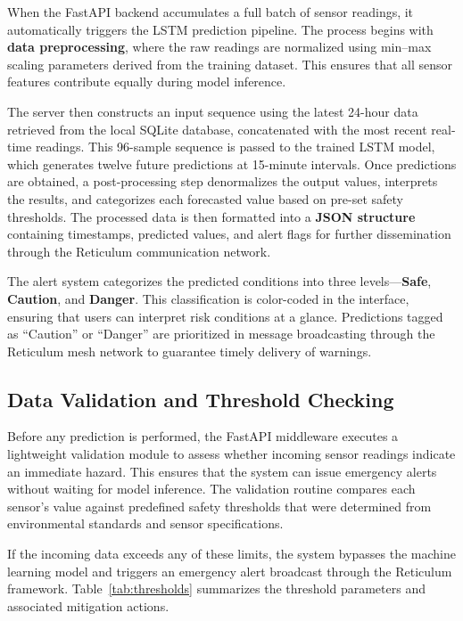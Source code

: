 When the FastAPI backend accumulates a full batch of sensor readings, it automatically triggers the LSTM prediction pipeline. The process begins with \textbf{data preprocessing}, where the raw readings are normalized using min–max scaling parameters derived from the training dataset. This ensures that all sensor features contribute equally during model inference.

The server then constructs an input sequence using the latest 24-hour data retrieved from the local SQLite database, concatenated with the most recent real-time readings. This 96-sample sequence is passed to the trained LSTM model, which generates twelve future predictions at 15-minute intervals. Once predictions are obtained, a post-processing step denormalizes the output values, interprets the results, and categorizes each forecasted value based on pre-set safety thresholds. The processed data is then formatted into a \textbf{JSON structure} containing timestamps, predicted values, and alert flags for further dissemination through the Reticulum communication network.

The alert system categorizes the predicted conditions into three levels—\textbf{Safe}, \textbf{Caution}, and \textbf{Danger}. This classification is color-coded in the interface, ensuring that users can interpret risk conditions at a glance. Predictions tagged as “Caution” or “Danger” are prioritized in message broadcasting through the Reticulum mesh network to guarantee timely delivery of warnings.

\subsection{Data Validation and Threshold Checking}

Before any prediction is performed, the FastAPI middleware executes a lightweight validation module to assess whether incoming sensor readings indicate an immediate hazard. This ensures that the system can issue emergency alerts without waiting for model inference. The validation routine compares each sensor’s value against predefined safety thresholds that were determined from environmental standards and sensor specifications.

If the incoming data exceeds any of these limits, the system bypasses the machine learning model and triggers an emergency alert broadcast through the Reticulum framework. Table~\ref{tab:thresholds} summarizes the threshold parameters and associated mitigation actions.

